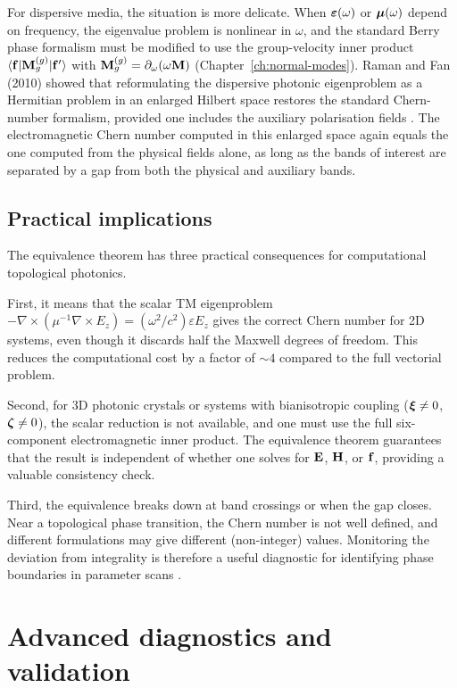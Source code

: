 For dispersive media, the situation is more delicate.  When
$\boldsymbol{\varepsilon}(\omega)$ or $\boldsymbol{\mu}(\omega)$ depend on frequency, the eigenvalue
problem is nonlinear in $\omega$, and the standard Berry phase
formalism must be modified to use the group-velocity inner product
$\langle\mathbf{f}|\mathbf{M}_g^{(g)}|\mathbf{f}'\rangle$ with
$\mathbf{M}_g^{(g)} = \partial_\omega(\omega\mathbf{M})$
(Chapter~\ref{ch:normal-modes}).  Raman and Fan (2010) showed that
reformulating the dispersive photonic eigenproblem as a Hermitian
problem in an enlarged Hilbert space restores the standard Chern-number
formalism, provided one includes the auxiliary polarisation fields
\cite{raman2010photonic}.  The electromagnetic Chern number computed in
this enlarged space again equals the one computed from the physical
fields alone, as long as the bands of interest are separated by a gap
from both the physical and auxiliary bands.

\subsection{Practical implications}
\label{sec:ch10-practical-equiv}

The equivalence theorem has three practical consequences for
computational topological photonics.

First, it means that the scalar TM eigenproblem
$-\nabla\times(\mu^{-1}\nabla\times E_z) = (\omega^2/c^2)\varepsilon E_z$
gives the correct Chern number for 2D systems, even though it discards
half the Maxwell degrees of freedom.  This reduces the computational
cost by a factor of $\sim 4$ compared to the full vectorial problem.

Second, for 3D photonic crystals or systems with bianisotropic coupling
($\boldsymbol{\xi}\neq 0$, $\boldsymbol{\zeta}\neq 0$), the scalar reduction is not available,
and one must use the full six-component electromagnetic inner product.
The equivalence theorem guarantees that the result is independent of
whether one solves for $\mathbf{E}$, $\mathbf{H}$, or $\mathbf{f}$, providing
a valuable consistency check.

Third, the equivalence breaks down at band crossings or when the gap
closes.  Near a topological phase transition, the Chern number is not
well defined, and different formulations may give different
(non-integer) values.  Monitoring the deviation from integrality is
therefore a useful diagnostic for identifying phase boundaries in
parameter scans \cite{chen2023berry,zhao2020first}.

\section{Advanced diagnostics and validation}
\label{sec:ch10-advanced-diagnostics}

